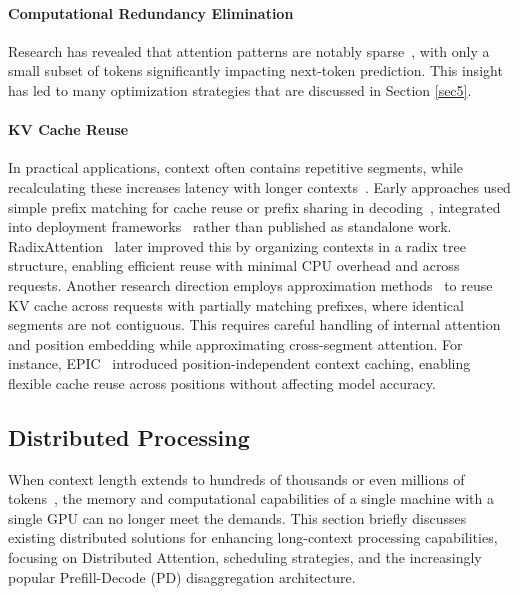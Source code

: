 \paragraph{Computational Redundancy Elimination}
Research has revealed that attention patterns are notably sparse~\citep{xiaoefficient, jiang2024minference}, with only a small subset of tokens significantly impacting next-token prediction. This insight has led to many optimization strategies that are discussed in Section \ref{sec5}.

\paragraph{KV Cache Reuse}
In practical applications, context often contains repetitive segments, while recalculating these increases latency with longer contexts~\citep{gim2024prompt}. Early approaches used simple prefix matching for cache reuse or prefix sharing in decoding~\citep{juravsky2024hydragen, cascade-inference}, integrated into deployment frameworks~\citep{NVIDIA2024tensorrt-llm, FlashInfer0.1, FlashInfer0.2, lin2024parrot} rather than published as standalone work. RadixAttention~\citep{zheng2024sglang} later improved this by organizing contexts in a radix tree structure, enabling efficient reuse with minimal CPU overhead and across requests. Another research direction employs approximation methods~\citep{hu2024epic, yao2024cacheblend} to reuse KV cache across requests with partially matching prefixes, where identical segments are not contiguous. This requires careful handling of internal attention and position embedding while approximating cross-segment attention. For instance, EPIC~\citep{hu2024epic} introduced position-independent context caching, enabling flexible cache reuse across positions without affecting model accuracy. 

\subsection{Distributed Processing}\label{sec7_3}

When context length extends to hundreds of thousands or even millions of tokens~\citep{yang2024qwen2technicalreport, qwen2024qwen25technicalreport, reid2024gemini, InternLM25}, the memory and computational capabilities of a single machine with a single GPU can no longer meet the demands. This section briefly discusses existing distributed solutions for enhancing long-context processing capabilities, focusing on Distributed Attention, scheduling strategies, and the increasingly popular Prefill-Decode (PD) disaggregation architecture.

